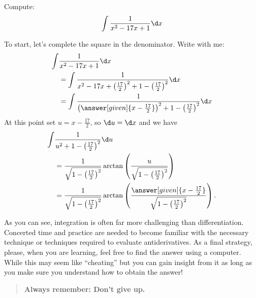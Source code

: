 \documentclass[nooutcomes]{ximera}
\begin{document}
\begin{example}
  Compute:
  \[
  \int \frac{1}{x^2-17x +1}\d x
  \]
  \begin{explanation}
    To start, let's complete the square in the denominator. Write with me:
    \begin{align*}
      \int &\frac{1}{x^2-17x +1} \d x \\
      &=  \int \frac{1}{x^2-17x +\left(\frac{17}{2}\right)^2 + 1 - \left(\frac{17}{2}\right)^2} \d x\\
      &=  \int \frac{1}{\left(\answer[given]{x-\frac{17}{2}}\right)^2 + 1 - \left(\frac{17}{2}\right)^2} \d x
    \end{align*}
    At this point set $u= x-\frac{17}{2}$, so $\d u = \d x$ and we have
    \begin{align*}
    \int &\frac{1}{u^2 + 1 - \left(\frac{17}{2}\right)^2} \d u \\
    &= \frac{1}{\sqrt{1 - \left(\frac{17}{2}\right)^2}} \arctan\left(\frac{u}{\sqrt{1 - \left(\frac{17}{2}\right)^2}}\right)\\
    &= \frac{1}{\sqrt{1 - \left(\frac{17}{2}\right)^2}} \arctan\left(\frac{\answer[given]{x-\frac{17}{2}}}{\sqrt{1 - \left(\frac{17}{2}\right)^2}}\right).
    \end{align*}
  \end{explanation}
\end{example}

As you can see, integration is often far more challenging than differentiation.  Concerted time and practice are needed to become familiar with the necessary technique or techniques required to evaluate antiderivatives.  As a final strategy, please, when you are learning, feel free to find
the answer using a computer. While this may seem like ``cheating'' but you
can gain insight from it as long as you make sure you understand how to obtain the answer! 
\begin{quote}
  \textbf{Always remember: Don't give up.}
\end{quote}
\end{document}
